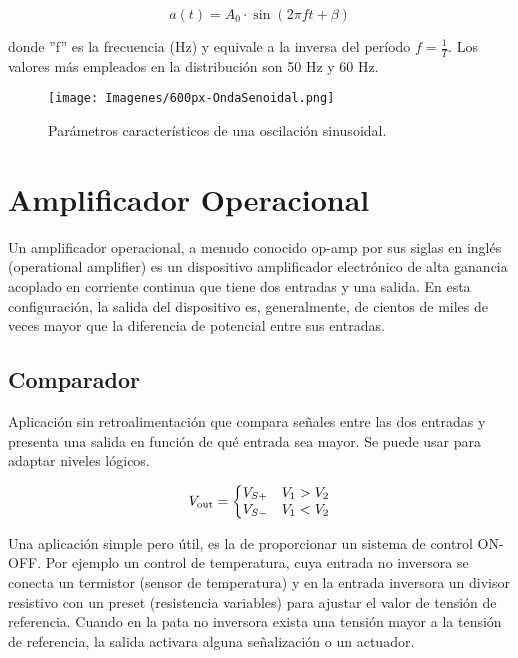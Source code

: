 \documentclass{article}
\begin{document}
\begin{equation}
    a(t)=A_0 \cdot \sin(2 \pi f t + \beta)
\end{equation}


donde ''f'' es la frecuencia (Hz) y equivale a la inversa del período $f=\frac{1}{T}$. Los valores más empleados en la distribución son 50 Hz y 60 Hz.\citep{CA}


\begin{figure}[H!]
    \centering
    \texttt{[image: Imagenes/600px-OndaSenoidal.png]}
    \caption{Parámetros característicos de una oscilación sinusoidal.}
    \label{fig:ondaSenoidal}
\end{figure}


\section{Amplificador Operacional}

Un amplificador operacional, a menudo conocido op-amp por sus siglas en inglés (operational amplifier) es un dispositivo amplificador electrónico de alta ganancia acoplado en corriente continua que tiene dos entradas y una salida. En esta configuración, la salida del dispositivo es, generalmente, de cientos de miles de veces mayor que la diferencia de potencial entre sus entradas.\citep{AmplificadorOperacional}


\subsection{Comparador}


Aplicación sin retroalimentación que compara señales entre las dos entradas y presenta una salida en función de qué entrada sea mayor. Se puede usar para adaptar niveles lógicos.\citep{AmplificadorOperacional}

\begin{equation}
    {\displaystyle V_{\rm {out}}=\left\{{\begin{matrix}V_{S+}&V_{1}>V_{2}\\V_{S-}&V_{1}<V_{2}\end{matrix}}\right.} 
\end{equation}

Una aplicación simple pero útil, es la de proporcionar un sistema de control ON-OFF. Por ejemplo un control de temperatura, cuya entrada no inversora se conecta un termistor (sensor de temperatura) y en la entrada inversora un divisor resistivo con un preset (resistencia variables) para ajustar el valor de tensión de referencia. Cuando en la pata no inversora exista una tensión mayor a la tensión de referencia, la salida activara alguna señalización o un actuador.\citep{AmplificadorOperacional}
\end{document}
